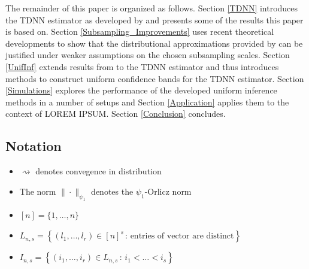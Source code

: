 \documentclass[letterpaper,10pt]{article}
\numberwithin{equation}{section}
\numberwithin{theorem}{section}
\numberwithin{remark}{section}
\numberwithin{example}{section}
\theoremstyle{definition}
\newcommand{\1}{\mathbb{1}}
\begin{document}
The remainder of this paper is organized as follows.
Section \ref{TDNN} introduces the TDNN estimator as developed by \citet{demirkaya_optimal_2024} and presents some of the results this paper is based on.
Section \ref{Subsampling_Improvements} uses recent theoretical developments to show that the distributional approximations provided by \citet{demirkaya_optimal_2024} can be justified under weaker assumptions on the chosen subsampling scales.
Section \ref{UnifInf} extends results from \citet{ritzwoller_uniform_2024} to the TDNN estimator and thus introduces methods to construct uniform confidence bands for the TDNN estimator.
Section \ref{Simulations} explores the performance of the developed uniform inference methods in a number of setups and Section \ref{Application} applies them to the context of {\color{red} LOREM IPSUM}.
Section \ref{Conclusion} concludes.

\subsection{Notation}
\begin{itemize}
	\item $\rightsquigarrow$ denotes convegence in distribution
	\item The norm $\| \cdot \|_{\psi_1}$ denotes the $\psi_1$-Orlicz norm
	\item $[n] = \{1, \dotsc, n\}$
	\item $L_{n,s} = \left\{\left(l_1, \dotsc, l_r\right) \in [n]^{s} \, : \, \text{entries of vector are distinct} \right\}$
	\item $I_{n,s} = \left\{\left(i_1, \dotsc, i_r\right) \in L_{n,s} \, : \, i_1 < \dotsc < i_s \right\}$
\end{itemize}

\newpage
\end{document}
